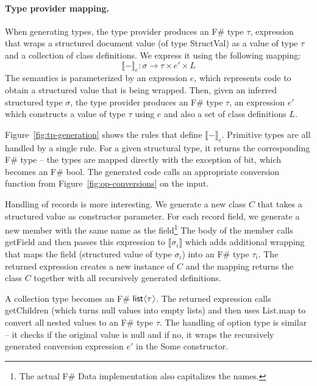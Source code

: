 \documentclass[preprint]{sigplanconf}
\newcommand{\langl}{\begin{picture}(4.5,7)
\put(1.1,2.5){\rotatebox{60}{\line(1,0){5.5}}}
\put(1.1,2.5){\rotatebox{300}{\line(1,0){5.5}}}
\end{picture}}
\newcommand{\rangl}{\begin{picture}(4.5,7)
\put(.9,2.5){\rotatebox{120}{\line(1,0){5.5}}}
\put(.9,2.5){\rotatebox{240}{\line(1,0){5.5}}}
\end{picture}}
\newcommand{\kvd}[1]{\textnormal{\textcolor{kvdclr}{\sffamily #1}}}
\newcommand{\ident}[1]{\textnormal{\sffamily #1}}
\newcommand{\sem}[1]{\llbracket #1 \rrbracket}
\begin{document}
\paragraph{Type provider mapping.}
When generating types, the type provider produces an F\# type $\tau$, expression that wraps a structured 
document value (of type \ident{StructVal}) as a value of type $\tau$ and a collection of class definitions. 
We express it using the following mapping:
%
\begin{equation*}
\sem{-}_e : \sigma \rightarrow \tau \times e' \times L
\end{equation*}
%
The semantics is parameterized by an expression $e$, which represents code to obtain a structured value that is
being wrapped. Then, given an inferred structured type $\sigma$, the type provider produces an F\# type $\tau$,
an expression $e'$ which constructs a value of type $\tau$ using $e$ and also a set of class definitions $L$.

Figure~\ref{fig:tp-generation} shows the rules that define $\sem{-}_e$. Primitive types are all
handled by a single rule. For a given structural type, it returns the corresponding F\# type -- the types are
mapped directly with the exception of \ident{bit}, which becomes an F\# \ident{bool}. The generated code calls
an appropriate conversion function from Figure~\ref{fig:op-conversions} on the input.

Handling of records is more interesting. We generate a new class $C$ that takes a structured value as constructor
parameter. For each record field, we generate a new member with the same name as the field\footnote{The actual
F\# Data implementation also capitalizes the names.} The body of the member calls \ident{getField} and then
passes this expression to $\sem{\sigma_i}$ which adds additional wrapping that maps the field (structured value
of type $\sigma_i$) into an F\# type $\tau_i$. The returned expression creates a new instance of $C$ and
the mapping returns the class $C$ together with all recursively generated definitions.

A collection type becomes an F\# $\ident{list}\langl\tau\rangl$. The returned expression calls \ident{getChildren}
(which turns \kvd{null} values into empty lists) and then uses \ident{List.map} to convert all nested values to 
an F\# type $\tau$. The handling of option type is similar -- it checks if the original value is \kvd{null} and
if no, it wraps the recursively generated conversion expression $e'$ in the \ident{Some} constructor.
\end{document}
